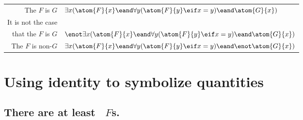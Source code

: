 \begin{center}
\begin{tabular*}{\textwidth}{rl}
The $F$ is $G$ & $\exists x(\atom{F}{x} \eand \forall y(\atom{F}{y} \eif x=y) \eand \atom{G}{x} )$\\
It is not the case \\ that
 the $F$ is $G$ & $\enot\exists x(\atom{F}{x} \eand \forall y(\atom{F}{y} \eif x=y) \eand \atom{G}{x} )$\\
The $F$ is non-$G$ & $\exists x(\atom{F}{x} \eand \forall y(\atom{F}{y} \eif x=y) \eand \enot \atom{G}{x} )$
\end{tabular*}
\end{center}







\newpage
\section{Using identity to symbolize quantities}

\subsection*{There are at least \blank\ $F$s.}
\label{summary.atleast}


